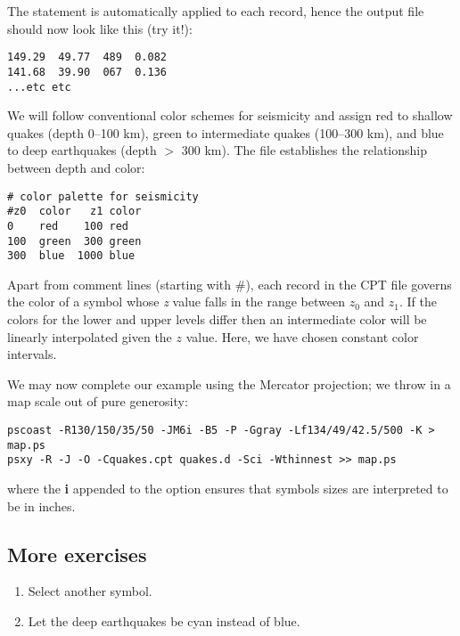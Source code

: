 \documentclass[11pt]{report}
\begin{document}
The  statement is automatically applied to each record,
hence the output file  should now look like this (try it!):

{\small\begin{verbatim}
149.29  49.77  489  0.082
141.68  39.90  067  0.136
...etc etc
\end{verbatim}
}

We will follow conventional color schemes for seismicity and assign red
to shallow quakes (depth 0--100 km), green to intermediate quakes
(100--300 km), and blue to deep earthquakes (depth $>$ 300 km).  The
 file establishes the relationship between depth
and color:

{\small\begin{verbatim}
# color palette for seismicity
#z0  color   z1 color
0    red    100 red
100  green  300 green
300  blue  1000 blue
\end{verbatim}
}

Apart from comment lines (starting with \#), each record in the CPT file
governs the color of a symbol whose \emph{z} value falls in the range between
$z_0$ and $z_1$.  If the colors for the lower and upper levels differ
then an intermediate color will be linearly interpolated given the $z$
value.  Here, we have chosen constant color intervals.

We may now complete our example using the Mercator projection; we throw in a
map scale out of pure generosity:

{\small\begin{verbatim} 
pscoast -R130/150/35/50 -JM6i -B5 -P -Ggray -Lf134/49/42.5/500 -K > map.ps
psxy -R -J -O -Cquakes.cpt quakes.d -Sci -Wthinnest >> map.ps
\end{verbatim}
}

\noindent
where the \textbf{i} appended to the  option ensures that symbols
sizes are interpreted to be in inches.
\subsection{More exercises}

\begin{enumerate}

\item Select another symbol.

\item Let the deep earthquakes be cyan instead of blue.

\end{enumerate}
\end{document}
